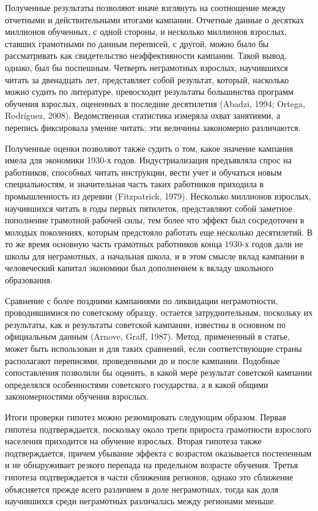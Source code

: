 \documentclass[12pt]{article}
\begin{document}
Полученные результаты позволяют иначе взглянуть на соотношение между отчетными и действительными итогами кампании. Отчетные данные о десятках миллионов обученных, с одной стороны, и несколько миллионов взрослых, ставших грамотными по данным переписей, с другой, можно было бы рассматривать как свидетельство неэффективности кампании. Такой вывод, однако, был бы поспешным. Четверть неграмотных взрослых, научившихся читать за двенадцать лет, представляет собой результат, который, насколько можно судить по литературе, превосходит результаты большинства программ обучения взрослых, оцененных в последние десятилетия (Abadzi, 1994; Ortega, Rodríguez, 2008). Ведомственная статистика измеряла охват занятиями, а перепись фиксировала умение читать; эти величины закономерно различаются.

Полученные оценки позволяют также судить о том, какое значение кампания имела для экономики 1930-х годов. Индустриализация предъявляла спрос на работников, способных читать инструкции, вести учет и обучаться новым специальностям, и значительная часть таких работников приходила в промышленность из деревни (Fitzpatrick, 1979). Несколько миллионов взрослых, научившихся читать в годы первых пятилеток, представляют собой заметное пополнение грамотной рабочей силы, тем более что эффект был сосредоточен в молодых поколениях, которым предстояло работать еще несколько десятилетий. В то же время основную часть грамотных работников конца 1930-х годов дали не школы для неграмотных, а начальная школа, и в этом смысле вклад кампании в человеческий капитал экономики был дополнением к вкладу школьного образования.

Сравнение с более поздними кампаниями по ликвидации неграмотности, проводившимися по советскому образцу, остается затруднительным, поскольку их результаты, как и результаты советской кампании, известны в основном по официальным данным (Arnove, Graff, 1987). Метод, примененный в статье, может быть использован и для таких сравнений, если соответствующие страны располагают переписями, проведенными до и после кампании. Подобные сопоставления позволили бы оценить, в какой мере результат советской кампании определялся особенностями советского государства, а в какой общими закономерностями обучения взрослых.

Итоги проверки гипотез можно резюмировать следующим образом. Первая гипотеза подтверждается, поскольку около трети прироста грамотности взрослого населения приходится на обучение взрослых. Вторая гипотеза также подтверждается, причем убывание эффекта с возрастом оказывается постепенным и не обнаруживает резкого перепада на предельном возрасте обучения. Третья гипотеза подтверждается в части сближения регионов, однако это сближение объясняется прежде всего различием в доле неграмотных, тогда как доля научившихся среди неграмотных различалась между регионами меньше.
\end{document}
